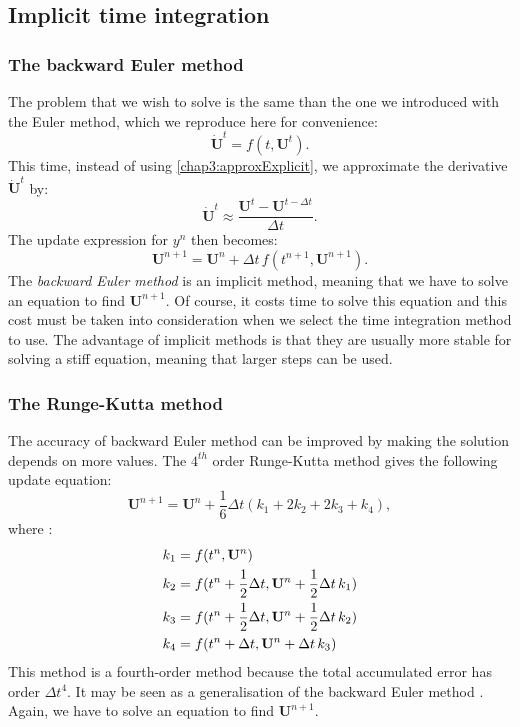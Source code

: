 	\subsection{Implicit time integration}
	
		\subsubsection*{The backward Euler method}
The problem that we wish to solve is the same than the one we introduced with the Euler method, which we reproduce here for convenience:
\begin{equation}
\mathbf{\dot U}^t = f(t, \mathbf{U}^t).
\end{equation}
This time, instead of using \eqref{chap3:approxExplicit}, we approximate the derivative $ \mathbf{\dot U}^t $ by:
\begin{equation}
\mathbf{\dot U}^t \approx \dfrac{\mathbf{U}^t - \mathbf{U}^{t-\Delta t}}{\Delta t}.
\end{equation}
The update expression for $ y^n $ then becomes:
\begin{equation}
\mathbf{U}^{n+1} = \mathbf{U}^n + \Delta t \, f(t^{n+1}, \mathbf{U}^{n+1}).
\end{equation}
The \emph{backward Euler method} is an implicit method, meaning that we have to solve an equation to find $ \mathbf{U}^{n+1} $. Of course, it costs time to solve this equation and this cost must be taken into consideration when we select the time integration method to use. The advantage of implicit methods is that they are usually more stable for solving a stiff equation, meaning that larger steps can be used. 

	\subsubsection*{The Runge-Kutta method}
The accuracy of backward Euler method can be improved by making the solution depends on more values. The $ 4^{th} $ order Runge-Kutta method gives the following update equation:
\begin{equation}
\mathbf{U}^{n+1} = \mathbf{U}^{n} + \frac{1}{6} \Delta t \left( k_1 + 2 k_2 + 2 k_3 +k_4 \right),
\end{equation}
where :
\begin{align}
k_1 &= f(t^n, \mathbf{U}^n) \notag \\
k_2 &= f(t^n + \frac{1}{2} \Delta t, \mathbf{U}^n + \frac{1}{2} \Delta t \, k_1) \notag \\
k_3 &= f(t^n + \frac{1}{2} \Delta t, \mathbf{U}^n + \frac{1}{2} \Delta t \, k_2) \notag \\
k_4 &= f(t^n + \Delta t, \mathbf{U}^n + \Delta t \, k_3) \notag
\end{align}
This method is a fourth-order method because the total accumulated error has order $ \Delta t^4 $. It may be seen as a generalisation of the backward Euler method \citep{Press92}. Again, we have to solve an equation to find $ \mathbf{U}^{n+1} $. 

